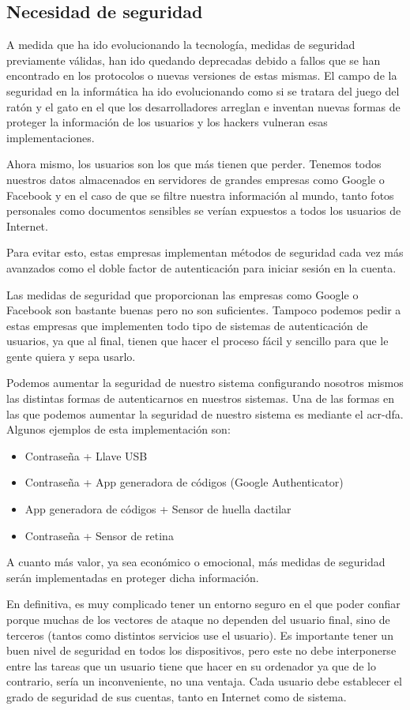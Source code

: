 \documentclass[titlepage, 12pt, a4paper]{article}
\begin{document}
\subsection{Necesidad de seguridad}
A medida que ha ido evolucionando la tecnología, medidas de seguridad previamente válidas, han ido quedando deprecadas debido a fallos que se han encontrado en los protocolos o nuevas versiones de estas mismas. El campo de la seguridad en la informática ha ido evolucionando como si se tratara del juego del ratón y el gato en el que los desarrolladores arreglan e inventan nuevas formas de proteger la información de los usuarios y los hackers vulneran esas implementaciones.\par Ahora mismo, los usuarios son los que más tienen que perder. Tenemos todos nuestros datos almacenados en servidores de grandes empresas como Google o Facebook y en el caso de que se filtre nuestra información al mundo, tanto fotos personales como documentos sensibles se verían expuestos a todos los usuarios de Internet.\par Para evitar esto, estas empresas implementan métodos de seguridad cada vez más avanzados como el doble factor de autenticación para iniciar sesión en la cuenta.\par Las medidas de seguridad que proporcionan las empresas como Google o Facebook son bastante buenas pero no son suficientes. Tampoco podemos pedir a estas empresas que implementen todo tipo de sistemas de autenticación de usuarios, ya que al final, tienen que hacer el proceso fácil y sencillo para que le gente quiera y sepa usarlo.\par Podemos aumentar la seguridad de nuestro sistema configurando nosotros mismos las distintas formas de autenticarnos en nuestros sistemas. Una de las formas en las que podemos aumentar la seguridad de nuestro sistema es mediante el \gls{acr-dfa}. Algunos ejemplos de esta implementación son:
\begin{itemize}
	\item Contraseña + Llave USB
	\item Contraseña + App generadora de códigos (Google Authenticator)
	\item App generadora de códigos + Sensor de huella dactilar
	\item Contraseña + Sensor de retina
\end{itemize}
A cuanto más valor, ya sea económico o emocional, más medidas de seguridad serán implementadas en proteger dicha información.\par
En definitiva, es muy complicado tener un entorno seguro en el que poder confiar porque muchas de los vectores de ataque no dependen del usuario final, sino de terceros (tantos como distintos servicios use el usuario). Es importante tener un buen nivel de seguridad en todos los dispositivos, pero este no debe interponerse entre las tareas que un usuario tiene que hacer en su ordenador ya que de lo contrario, sería un inconveniente, no una ventaja. Cada usuario debe establecer el grado de seguridad de sus cuentas, tanto en Internet como de sistema.\par
\end{document}
